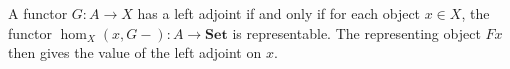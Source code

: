 A functor $G: A \to X$ has a left adjoint if and only if for each object $x \in X$, the functor $\hom_X(x, G-): A \to \mathbf{Set}$ is representable. The representing object $Fx$ then gives the value of the left adjoint on $x$.

